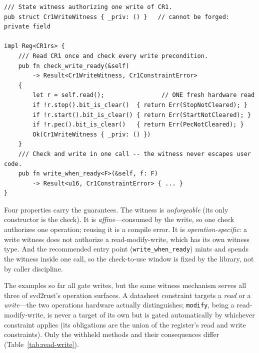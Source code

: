 \begin{lstlisting}
/// State witness authorizing one write of CR1.
pub struct Cr1WriteWitness { _priv: () }   // cannot be forged: private field

impl Reg<CR1rs> {
    /// Read CR1 once and check every write precondition.
    pub fn check_write_ready(&self)
        -> Result<Cr1WriteWitness, Cr1ConstraintError>
    {
        let r = self.read();                // ONE fresh hardware read
        if !r.stop().bit_is_clear()  { return Err(StopNotCleared); }
        if !r.start().bit_is_clear() { return Err(StartNotCleared); }
        if !r.pec().bit_is_clear()   { return Err(PecNotCleared); }
        Ok(Cr1WriteWitness { _priv: () })
    }
    /// Check and write in one call -- the witness never escapes user code.
    pub fn write_when_ready<F>(&self, f: F)
        -> Result<u16, Cr1ConstraintError> { ... }
}
\end{lstlisting}

Four properties carry the guarantees. The witness is \emph{unforgeable} (its
only constructor is the check). It is \emph{affine}---consumed by the write,
so one check authorizes one operation; reusing it is a compile error. It is
\emph{operation-specific}: a write witness does not authorize a
read-modify-write, which has its own witness type. And the recommended entry
point (\texttt{write\_when\_ready}) mints and spends the witness inside one
call, so the check-to-use window is fixed by the library, not by caller
discipline.

The examples so far all gate writes, but the same witness mechanism serves
all three of svd2rust's operation surfaces. A datasheet constraint targets a
\emph{read} or a \emph{write}---the two operations hardware actually
distinguishes; \texttt{modify}, being a read-modify-write, is never a target
of its own but is gated automatically by whichever constraint applies (its
obligations are the union of the register's read and write constraints). Only
the withheld methods and their consequences differ
(Table~\ref{tab:read-write}).

